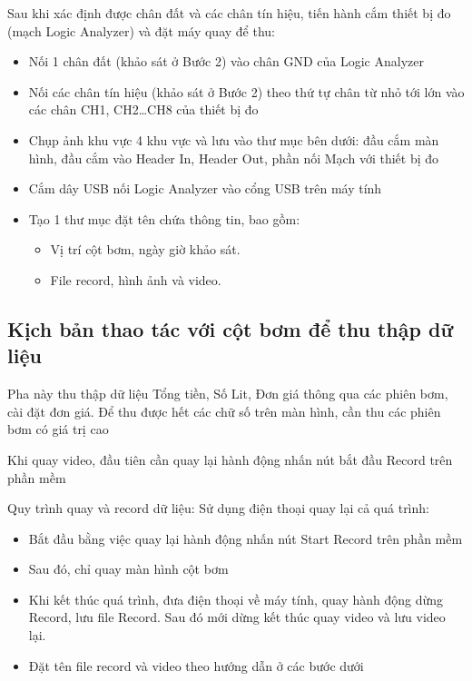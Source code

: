 Sau khi xác định được chân đất và các chân tín hiệu, tiến hành cắm thiết bị đo (mạch Logic Analyzer) và đặt máy quay để thu:
\begin{itemize}
    \item Nối 1 chân đất (khảo sát ở Bước 2) vào chân GND của Logic Analyzer		
    \item Nối các chân tín hiệu (khảo sát ở Bước 2) theo thứ tự chân từ nhỏ tới lớn vào các chân CH1, CH2…CH8 của thiết bị đo
    \item Chụp ảnh khu vực 4 khu vực và lưu vào thư mục bên dưới: đầu cắm màn hình, đầu cắm vào Header In, Header Out, phần nối Mạch với thiết bị đo	
    \item Cắm dây USB nối Logic Analyzer vào cổng USB trên máy tính		
    \item Tạo 1 thư mục đặt tên chứa thông tin, bao gồm:
    \begin{itemize}
        \item Vị trí cột bơm, ngày giờ khảo sát.
        \item File record, hình ảnh và video.
    \end{itemize}	

\end{itemize}

\subsection{Kịch bản thao tác với cột bơm để thu thập dữ liệu}


     Pha này thu thập dữ liệu Tổng tiền, Số Lit, Đơn giá thông qua các phiên bơm, cài đặt đơn giá. Để thu được hết các chữ số trên màn hình, cần thu các phiên bơm có giá trị cao
  
     Khi quay video, đầu tiên cần quay lại hành động nhấn nút bắt đầu Record trên phần mềm
 
     Quy trình quay và record dữ liệu:
Sử dụng điện thoại quay lại cả quá trình:

\begin{itemize}
    \item Bắt đầu bằng việc quay lại hành động nhấn nút Start Record trên phần mềm
    \item Sau đó, chỉ quay màn hình cột bơm
    \item Khi kết thúc quá trình, đưa điện thoại về máy tính, quay hành động dừng Record, lưu file Record. Sau đó mới dừng kết thúc quay video và lưu video lại.
    \item Đặt tên file record và video theo hướng dẫn ở các bước dưới
\end{itemize}

